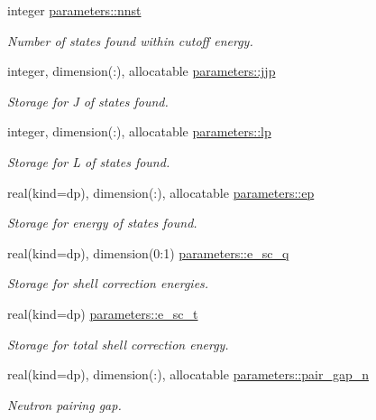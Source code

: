 \begin{DoxyCompactItemize}
integer \mbox{\hyperlink{group__STRUTINSKY_gae6e7b96f6ed3aba1ba90ec3567d8e83d}{parameters\+::nnst}}
\begin{DoxyCompactList}\small\item\em Number of states found within cutoff energy. \end{DoxyCompactList}\item 
integer, dimension(\+:), allocatable \mbox{\hyperlink{group__STRUTINSKY_ga73b3d3e4bef13fcc24049d5e9fe16bb2}{parameters\+::jjp}}
\begin{DoxyCompactList}\small\item\em Storage for J of states found. \end{DoxyCompactList}\item 
integer, dimension(\+:), allocatable \mbox{\hyperlink{group__STRUTINSKY_gaff7c4f2e2ade60a6581e2335dca2eda3}{parameters\+::lp}}
\begin{DoxyCompactList}\small\item\em Storage for L of states found. \end{DoxyCompactList}\item 
real(kind=dp), dimension(\+:), allocatable \mbox{\hyperlink{group__STRUTINSKY_gaa02842b39c139c8fe6da09650a18113a}{parameters\+::ep}}
\begin{DoxyCompactList}\small\item\em Storage for energy of states found. \end{DoxyCompactList}\item 
real(kind=dp), dimension(0\+:1) \mbox{\hyperlink{group__STRUTINSKY_ga8f402c8fe224c0fa1965b57701b6e597}{parameters\+::e\+\_\+sc\+\_\+q}}
\begin{DoxyCompactList}\small\item\em Storage for shell correction energies. \end{DoxyCompactList}\item 
real(kind=dp) \mbox{\hyperlink{group__STRUTINSKY_ga48fd0dbdf687c86420599443535e70c8}{parameters\+::e\+\_\+sc\+\_\+t}}
\begin{DoxyCompactList}\small\item\em Storage for total shell correction energy. \end{DoxyCompactList}\item 
real(kind=dp), dimension(\+:), allocatable \mbox{\hyperlink{group__PAIRING_ga2017e6d9cb3446579e4231db5ee50d0c}{parameters\+::pair\+\_\+gap\+\_\+n}}
\begin{DoxyCompactList}\small\item\em Neutron pairing gap. \end{DoxyCompactList}\item 

\end{DoxyCompactItemize}
